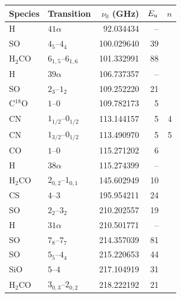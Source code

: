 \begin{tabular}{@{}llr@{\,}rr@{}}
\hline
Species & Transition & $\nu_0$ (GHz) & $E_{\rm u}$ & $n$ \\
\hline
H & $41\alpha$ & 92.034434 & -- &  \\
SO & $4_{5}$--$4_{4}$ & 100.029640 & 39 &  \\
H$_2$CO & $6_{1,5}$--$6_{1,6}$ & 101.332991 & 88 &  \\
H & $39\alpha$ & 106.737357 & -- &  \\
SO & $2_{3}$--$1_{2}$ & 109.252220 & 21 &  \\
C$^{18}$O & $1$--$0$ & 109.782173 & 5 &  \\
CN & $1_{1/2}$--$0_{1/2}$ & 113.144157 & 5 & 4 \\
CN & $1_{3/2}$--$0_{1/2}$ & 113.490970 & 5 & 5 \\
CO & $1$--$0$ & 115.271202 & 6 &  \\
H & $38\alpha$ & 115.274399 & -- &  \\
H$_2$CO & $2_{0,2}$--$1_{0,1}$ & 145.602949 & 10 &  \\
CS & $4$--$3$ & 195.954211 & 24 &  \\
SO & $2_{2}$--$3_{2}$ & 210.202557 & 19 &  \\
H & $31\alpha$ & 210.501771 & -- &  \\
SO & $7_{8}$--$7_{7}$ & 214.357039 & 81 &  \\
SO & $5_{5}$--$4_{4}$ & 215.220653 & 44 &  \\
SiO & $5$--$4$ & 217.104919 & 31 &  \\
H$_2$CO & $3_{0,3}$--$2_{0,2}$ & 218.222192 & 21 &  \\
\hline
\end{tabular}%
\hfill
